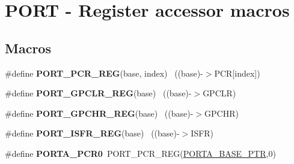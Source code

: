 \hypertarget{group___p_o_r_t___register___accessor___macros}{}\section{P\+O\+R\+T -\/ Register accessor macros}
\label{group___p_o_r_t___register___accessor___macros}
\subsection*{Macros}
\begin{DoxyCompactItemize}
\item 
\hypertarget{group___p_o_r_t___register___accessor___macros_gac6f8c9eab2e63700616f4d4fa4a6ef0e}{}\#define {\bfseries P\+O\+R\+T\+\_\+\+P\+C\+R\+\_\+\+R\+E\+G}(base,  index)                              ~((base)-\/$>$P\+C\+R\mbox{[}index\mbox{]})\label{group___p_o_r_t___register___accessor___macros_gac6f8c9eab2e63700616f4d4fa4a6ef0e}

\item 
\hypertarget{group___p_o_r_t___register___accessor___macros_gabbf5476f842aa7b313fdd3fedad41ca1}{}\#define {\bfseries P\+O\+R\+T\+\_\+\+G\+P\+C\+L\+R\+\_\+\+R\+E\+G}(base)                                      ~((base)-\/$>$G\+P\+C\+L\+R)\label{group___p_o_r_t___register___accessor___macros_gabbf5476f842aa7b313fdd3fedad41ca1}

\item 
\hypertarget{group___p_o_r_t___register___accessor___macros_ga5436d30f4741eacd3c61c337b626ab55}{}\#define {\bfseries P\+O\+R\+T\+\_\+\+G\+P\+C\+H\+R\+\_\+\+R\+E\+G}(base)                                      ~((base)-\/$>$G\+P\+C\+H\+R)\label{group___p_o_r_t___register___accessor___macros_ga5436d30f4741eacd3c61c337b626ab55}

\item 
\hypertarget{group___p_o_r_t___register___accessor___macros_gace6266e51916939b6ebd7cdb38394c6f}{}\#define {\bfseries P\+O\+R\+T\+\_\+\+I\+S\+F\+R\+\_\+\+R\+E\+G}(base)                                        ~((base)-\/$>$I\+S\+F\+R)\label{group___p_o_r_t___register___accessor___macros_gace6266e51916939b6ebd7cdb38394c6f}

\item 
\hypertarget{group___p_o_r_t___register___accessor___macros_gaf09680dfe5ed3f1f4df46364406b5d65}{}\#define {\bfseries P\+O\+R\+T\+A\+\_\+\+P\+C\+R0}~P\+O\+R\+T\+\_\+\+P\+C\+R\+\_\+\+R\+E\+G(\hyperlink{group___p_o_r_t___peripheral_gaa18ec7594fe603225220ec6eda4a19ce}{P\+O\+R\+T\+A\+\_\+\+B\+A\+S\+E\+\_\+\+P\+T\+R},0)\label{group___p_o_r_t___register___accessor___macros_gaf09680dfe5ed3f1f4df46364406b5d65}


\end{DoxyCompactItemize}
